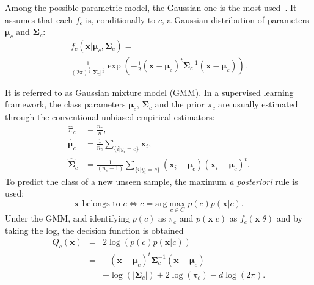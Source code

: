\documentclass[journal,peerreview,onecolumn]{IEEEtran}
\begin{document}
    Among the possible parametric model,  the Gaussian one is the most
    used~\cite{bouveyron2014model}.   It assumes  that each  $f_c$ is,
    conditionally  to  $c$,  a  Gaussian  distribution  of  parameters
    $\boldsymbol{\mu}_c$    and    $\boldsymbol{\Sigma}_c$:
    \begin{multline}
        f_c(\mathbf{x}|\boldsymbol{\mu}_c, \boldsymbol{\Sigma}_c) = \\ \frac{1}{(2\pi)^{\frac{d}{2}} |\boldsymbol{\Sigma}_c|^{\frac{1}{2}}} \exp \left( -\frac{1}{2} (\mathbf{x} - \boldsymbol{\mu}_c)^t \boldsymbol{\Sigma}_c^{-1} (\mathbf{x} - \boldsymbol{\mu}_c) \right).
    \end{multline}

    It  is  referred  to  as  Gaussian  mixture  model  (GMM).   In  a
    supervised    learning    framework,    the    class    parameters
    $\boldsymbol{\mu}_c$,   $\boldsymbol{\Sigma}_c$   and  the   prior
    $\pi_c$ are  usually estimated  through the  conventional unbiased
    empirical estimators:
    \begin{align}
        \hat{\pi}_c &= \frac{n_c}{n},\\
        \hat{\boldsymbol{\mu}}_c &= \frac{1}{n_c} \sum_{\{i|y_i = c\}} \mathbf{x}_i ,\\
        \hat{\boldsymbol{\Sigma}}_c &= \frac{1}{(n_c - 1)} \sum_{\{i|y_i = c\}} (\mathbf{x}_i - \boldsymbol{\mu}_c) (\mathbf{x}_i - \boldsymbol{\mu}_c)^t.
    \end{align}
    To predict the  class of a new unseen sample,  the maximum \emph{a
      posteriori}  rule  is  used:
    \begin{equation*}
        \mathbf{x} \text{ belongs to } c \Leftrightarrow c = \text{arg} \max_{c \in C} p(c) p(\mathbf{x}|c).
    \end{equation*}
    Under the GMM,  and identifying $p(c)$ as $\pi_c$  and $p(\mathbf{x}|c)$ as
    $f_c(\mathbf{x}|\theta)$ and by taking the log, the decision function is obtained
    \begin{eqnarray}\label{eq:decision}
      Q_c(\mathbf{x}) &=& 2 \log \left( p(c) p(\mathbf{x}|c) \right) \nonumber \\
                      &=& - (\mathbf{x} - \boldsymbol{\mu}_c)^t \boldsymbol{\Sigma}_c^{-1} (\mathbf{x} - \boldsymbol{\mu}_c) \nonumber \\
                      & &-\log (|\boldsymbol{\Sigma}_c|) + 2 \log (\pi_c) - d \log (2\pi).
    \end{eqnarray}
\end{document}
